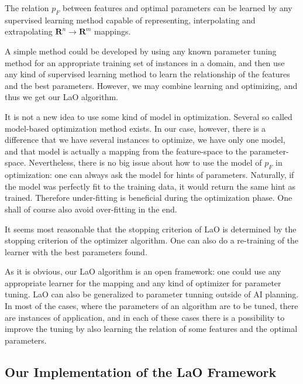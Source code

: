 \documentclass{article}
\begin{document}
The relation \begin{math} p_F \end{math} between features and optimal parameters can be learned by any supervised learning method capable of representing, interpolating and extrapolating  \begin{math}\mathbf{R}^n\to \mathbf{R}^m \end{math} mappings. 

A simple method could be developed by using any known parameter tuning method for an appropriate training set of instances in a domain, and then use any kind of supervised learning method to learn the relationship of the features and the best parameters. However, we may combine learning and optimizing, and thus we get our LaO algorithm.

It is not a new idea to use some kind of model in optimization. Several so called model-based optimization method exists. In our case, however, there is a difference that we have several instances to optimize, we have only one model, and that model is actually a mapping from the feature-space to the parameter-space. Nevertheless, there is no big issue about how to use the model of \begin{math}p_F\end{math} in optimization: one can always ask the model for hints of parameters. Naturally, if the model was perfectly fit to the training data, it would return the same hint as trained. Therefore under-fitting is beneficial during the optimization phase. One shall of course also avoid over-fitting in the end.

It seems most reasonable that the stopping criterion of LaO is determined by the stopping criterion of the optimizer algorithm. One can also do a re-training of the learner with the best parameters found.

As it is obvious, our LaO algorithm is an open framework: one could use any appropriate learner for the mapping and any kind of optimizer for parameter tuning. LaO can also be generalized to parameter tunning outside of AI planning. In most of the cases, where the parameters of an algorithm are to be tuned, there are instances of application, and in each of these cases there is a possibility to improve the tuning by also learning the relation of some features and the optimal parameters.

\subsection{Our Implementation of the LaO Framework}
\end{document}
